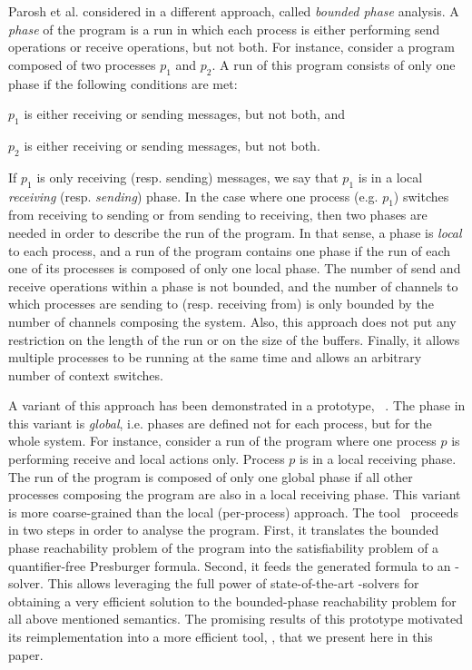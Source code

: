Parosh et al. considered in \cite{AAC13} a different approach, called \textit{bounded phase} analysis.
%
A \textit{phase} of the program is a run in which each process 
is either performing send operations or receive operations, but not both.
%
For instance, consider a program composed of two processes $p_1$ and $p_2$.
A run of this program consists of only one phase if the following conditions are met:
\begin{inparaenum}[i)]
\item $p_1$ is either receiving or sending messages, but not both, and
\item $p_2$ is either receiving or sending messages, but not both.
\end{inparaenum}
%
If $p_1$ is only receiving (resp. sending) messages, we say that $p_1$ is in a local \textit{receiving} (resp. \textit{sending}) phase.
%
In the case where one process (e.g. $p_1$) switches from receiving to sending or from sending to receiving,
then two phases are needed in order to describe the run of the program.
%
In that sense, a phase is \textit{local} to each process,
and a run of the program contains one phase
if the run of each one of its processes is composed of only one local phase.
%
The number of send and receive operations within a phase is not bounded,
and the number of channels to which processes are sending to (resp. receiving from)
is only bounded by the number of channels composing the system.
%
Also, this approach does not put any restriction on the length of the
run or on the size of the buffers.
%
Finally, it allows multiple processes to be running at the same time and allows an arbitrary number of context switches.

A variant of this approach has been demonstrated in a prototype, \alternator\ \cite{github.alternator}.
%
The phase in this variant is \textit{global}, i.e. phases are defined not for each process, but for the whole system.
%
For instance, consider a run of the program where one process $p$ is performing receive and local actions only.
Process $p$ is in a local receiving phase.
The run of the program is composed of only one global phase if all other processes composing the program are also in a local receiving phase.
%
This variant is more coarse-grained than the local (per-process) approach.
%
The tool \alternator\ proceeds in two steps in order to analyse the program.
%
First, it translates the bounded phase reachability problem of the program into the satisfiability problem of a quantifier-free Presburger formula.
Second, it feeds the generated formula to an \Smt-solver.
%
This allows leveraging the full power of state-of-the-art
\Smt-solvers for obtaining a very efficient solution to the bounded-phase reachability problem for all above mentioned semantics. 
%
%
The promising results of this prototype motivated its reimplementation into a more efficient tool, \MPass, that we present here in this paper.

